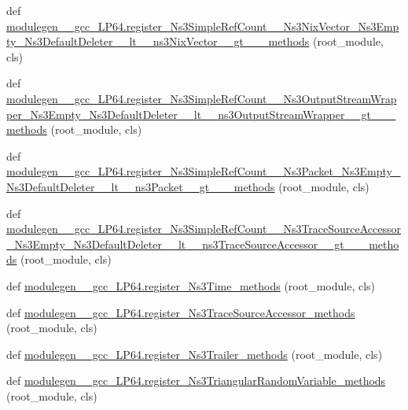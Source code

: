 \begin{DoxyCompactItemize}
\item 
def \hyperlink{namespacemodulegen____gcc__LP64_a965e9b7942715fc406cf9c83246b2bcb}{modulegen\+\_\+\+\_\+gcc\+\_\+\+L\+P64.\+register\+\_\+\+Ns3\+Simple\+Ref\+Count\+\_\+\+\_\+\+Ns3\+Nix\+Vector\+\_\+\+Ns3\+Empty\+\_\+\+Ns3\+Default\+Deleter\+\_\+\+\_\+lt\+\_\+\+\_\+ns3\+Nix\+Vector\+\_\+\+\_\+gt\+\_\+\+\_\+\+\_\+methods} (root\+\_\+module, cls)
\item 
def \hyperlink{namespacemodulegen____gcc__LP64_a44c8825c5388fc8e7a791e3762901c2b}{modulegen\+\_\+\+\_\+gcc\+\_\+\+L\+P64.\+register\+\_\+\+Ns3\+Simple\+Ref\+Count\+\_\+\+\_\+\+Ns3\+Output\+Stream\+Wrapper\+\_\+\+Ns3\+Empty\+\_\+\+Ns3\+Default\+Deleter\+\_\+\+\_\+lt\+\_\+\+\_\+ns3\+Output\+Stream\+Wrapper\+\_\+\+\_\+gt\+\_\+\+\_\+\+\_\+methods} (root\+\_\+module, cls)
\item 
def \hyperlink{namespacemodulegen____gcc__LP64_ad03a2df5680530337afef71c06f6d20d}{modulegen\+\_\+\+\_\+gcc\+\_\+\+L\+P64.\+register\+\_\+\+Ns3\+Simple\+Ref\+Count\+\_\+\+\_\+\+Ns3\+Packet\+\_\+\+Ns3\+Empty\+\_\+\+Ns3\+Default\+Deleter\+\_\+\+\_\+lt\+\_\+\+\_\+ns3\+Packet\+\_\+\+\_\+gt\+\_\+\+\_\+\+\_\+methods} (root\+\_\+module, cls)
\item 
def \hyperlink{namespacemodulegen____gcc__LP64_a2971d479713881f4a0fb7f82a5a0c162}{modulegen\+\_\+\+\_\+gcc\+\_\+\+L\+P64.\+register\+\_\+\+Ns3\+Simple\+Ref\+Count\+\_\+\+\_\+\+Ns3\+Trace\+Source\+Accessor\+\_\+\+Ns3\+Empty\+\_\+\+Ns3\+Default\+Deleter\+\_\+\+\_\+lt\+\_\+\+\_\+ns3\+Trace\+Source\+Accessor\+\_\+\+\_\+gt\+\_\+\+\_\+\+\_\+methods} (root\+\_\+module, cls)
\item 
def \hyperlink{namespacemodulegen____gcc__LP64_ade0bc7fc2ce1f975c0f8f367acfc957c}{modulegen\+\_\+\+\_\+gcc\+\_\+\+L\+P64.\+register\+\_\+\+Ns3\+Time\+\_\+methods} (root\+\_\+module, cls)
\item 
def \hyperlink{namespacemodulegen____gcc__LP64_abd8204bf10f1a73956889b2b56b0c2d3}{modulegen\+\_\+\+\_\+gcc\+\_\+\+L\+P64.\+register\+\_\+\+Ns3\+Trace\+Source\+Accessor\+\_\+methods} (root\+\_\+module, cls)
\item 
def \hyperlink{namespacemodulegen____gcc__LP64_a79f6f84947747209adf07fee76a18188}{modulegen\+\_\+\+\_\+gcc\+\_\+\+L\+P64.\+register\+\_\+\+Ns3\+Trailer\+\_\+methods} (root\+\_\+module, cls)
\item 
def \hyperlink{namespacemodulegen____gcc__LP64_a164735782e09ede8e4cec78054019282}{modulegen\+\_\+\+\_\+gcc\+\_\+\+L\+P64.\+register\+\_\+\+Ns3\+Triangular\+Random\+Variable\+\_\+methods} (root\+\_\+module, cls)
\item 

\end{DoxyCompactItemize}
